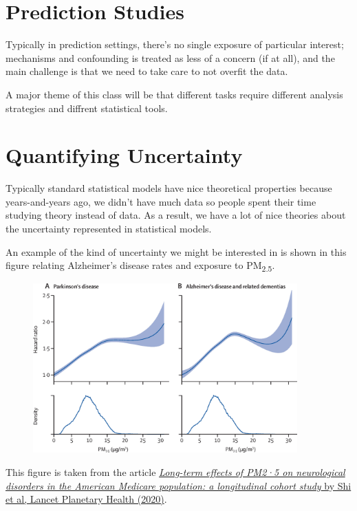 \documentclass[
  letterpaper,
  DIV=11,
  numbers=noendperiod]{scrreport}
\begin{document}
\hypertarget{prediction-studies}{%
\section{Prediction Studies}\label{prediction-studies}}

Typically in prediction settings, there's no single exposure of
particular interest; mechanisms and confounding is treated as less of a
concern (if at all), and the main challenge is that we need to take care
to not {overfit} the data.

A major theme of this class will be that different tasks require
different analysis strategies and diffrent statistical tools.

\hypertarget{quantifying-uncertainty}{%
\section{Quantifying Uncertainty}\label{quantifying-uncertainty}}

Typically standard statistical models have nice theoretical properties
because years-and-years ago, we didn't have much data so people spent
their time studying theory instead of data. As a result, we have a lot
of nice theories about the uncertainty represented in statistical
models.

An example of the kind of uncertainty we might be interested in is shown
in this figure relating Alzheimer's disease rates and exposure to
PM\textsubscript{2.5}.

\begin{figure}

{\centering \includegraphics[width=4in,height=\textheight]{week1/standalone_figures/pm2.5/pm25.jpg}

}

\end{figure}

This figure is taken from the article
\href{https://www.thelancet.com/journals/lanplh/article/PIIS2542-5196(20)30227-8/fulltext}{\emph{Long-term
effects of PM2·5 on neurological disorders in the American Medicare
population: a longitudinal cohort study} by Shi et al, Lancet Planetary
Health (2020)}.
\end{document}
